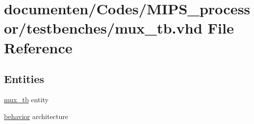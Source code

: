 \hypertarget{mux__tb_8vhd}{\section{documenten/\-Codes/\-M\-I\-P\-S\-\_\-processor/testbenches/mux\-\_\-tb.vhd File Reference}
\label{mux__tb_8vhd}
}
\subsection*{Entities}
\begin{DoxyCompactItemize}
\item 
\hyperlink{classmux__tb}{mux\-\_\-tb} entity
\item 
\hyperlink{classmux__tb_1_1behavior}{behavior} architecture
\end{DoxyCompactItemize}
